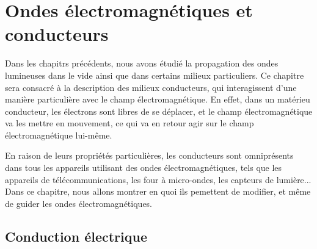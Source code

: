 \documentclass[11pt,fleqn]{book} %
\begin{document}










\setcounter{chapter}{17}

\chapter{Ondes électromagnétiques et conducteurs}

Dans les chapitrs précédents, nous avons étudié la propagation des ondes lumineuses dans le vide ainsi que dans certains milieux particuliers. Ce chapitre sera consacré à la description des milieux conducteurs, qui interagissent d'une manière particulière avec le champ électromagnétique. En effet, dans un matérieu conducteur, les électrons sont libres de se déplacer, et le champ électromagnétique va les mettre en mouvement, ce qui va en retour agir sur le champ électromagnétique lui-même. 

En raison de leurs propriétés particulières, les conducteurs sont omniprésents dans tous les appareils utilisant des ondes électromagnétiques, tels que les appareils de télécommunications, les four à micro-ondes, les capteurs de lumière... Dans ce chapitre, nous allons montrer en quoi ils pemettent de modifier, et même de guider les ondes électromagnétiques.

\section{Conduction électrique}
\end{document}
